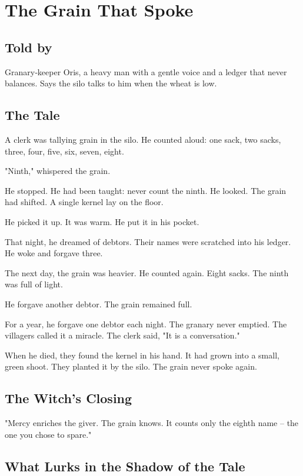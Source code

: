 \chapter{The Grain That Spoke}

\section*{Told by}
Granary‑keeper Oris, a heavy man with a gentle voice and a ledger that never balances. Says the silo talks to him when the wheat is low.

\section*{The Tale}

A clerk was tallying grain in the silo. He counted aloud: one sack, two sacks, three, four, five, six, seven, eight.

"Ninth," whispered the grain.

He stopped. He had been taught: never count the ninth. He looked. The grain had shifted. A single kernel lay on the floor.

He picked it up. It was warm. He put it in his pocket.

That night, he dreamed of debtors. Their names were scratched into his ledger. He woke and forgave three.

The next day, the grain was heavier. He counted again. Eight sacks. The ninth was full of light.

He forgave another debtor. The grain remained full.

For a year, he forgave one debtor each night. The granary never emptied. The villagers called it a miracle. The clerk said, "It is a conversation."

When he died, they found the kernel in his hand. It had grown into a small, green shoot. They planted it by the silo. The grain never spoke again.

\section*{The Witch's Closing}
"Mercy enriches the giver. The grain knows. It counts only the eighth name -- the one you chose to spare."

\section*{What Lurks in the Shadow of the Tale}

